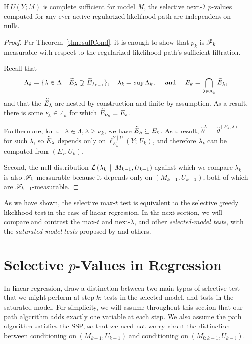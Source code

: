 \documentclass{article}
\begin{document}
\begin{corollary}\label{cor:nextLambdaIndep}
  If $U(Y; M)$ is complete sufficient for model $M$, the selective next-$\lambda$ $p$-values computed for any ever-active regularized likelihood path are independent on nulls.
\end{corollary}
\begin{proof}
  Per Theorem~\ref{thm:suffCond}, it is enough to show that $p_k$ is $\mathscr{F}_k$-measurable with respect to the regularized-likelihood path's sufficient filtration.

  Recall that 
  \[
  \Lambda_k = \{\lambda\in \Lambda:\; \widetilde{E}_\lambda \supsetneq \widetilde{E}_{\lambda_{k-1}}\},
  \quad 
  \lambda_k = \sup\Lambda_k,
  \quad \text{ and } \quad
  E_k = \bigcap_{\lambda\in\Lambda_k} \widetilde{E}_{\lambda},
  \]
  and that the $\widetilde{E}_{\lambda}$ are nested by construction and finite by assumption. As a result, there is some $\nu_k\in \Lambda_k$ for which $\widetilde{E}_{\nu_k} = E_k$. 
  
  Furthermore, for all $\lambda\in\Lambda, \lambda\geq \nu_k$, we have $\widetilde{E}_\lambda \subseteq E_k$. As a result, ${\hat\theta^{\lambda} =\hat\theta^{(E_k,\lambda)}}$ for such $\lambda$, so $\widetilde{E}_{\lambda}$ depends only on $\ell_{E_k}^{Y\mid U}(Y;\, U_k)$, and therefore $\lambda_k$ can be computed from $(E_k, U_k)$.

  Second, the null distribution $\mathcal{L}\left(\lambda_k \,\mid\, M_{k-1}, U_{k-1}\right)$ against which we compare $\lambda_k$ is also $\mathscr{F}_k$-measurable because it depends only on $(M_{k-1}, U_{k-1})$, both of which are $\mathscr{F}_{k-1}$-measurable.
\end{proof}

As we have shown, the selective max-$t$ test is equivalent to the selective greedy likelihood test in the case of linear regression. In the next section, we will compare and contrast the max-$t$ and next-$\lambda$, and other {\em selected-model tests}, with the {\em saturated-model tests} proposed by \citet{taylor2014exact} and others. 

\section{Selective $p$-Values in Regression}
\label{sec:selective-reg}
In linear regression, \citet{fithian2014optimal} draw a distinction between two main types of selective test that we might perform at step $k$: tests in the selected model, and tests in the saturated model. For simplicity, we will assume throughout this section that our path algorithm adds exactly one variable at each step. We also assume the path algorithm satisfies the SSP, so that we need not worry about the distinction between conditioning on $(M_{k-1}, U_{k-1})$ and conditioning on $(M_{0:k-1}, U_{k-1})$.
\end{document}
